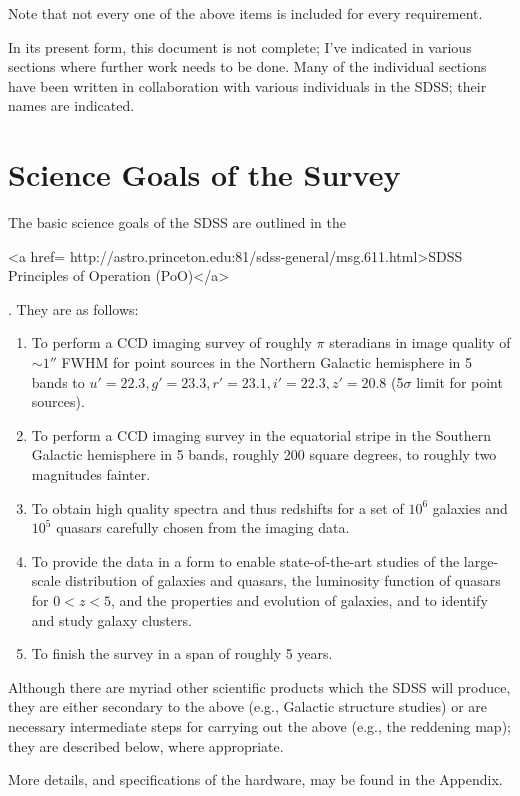 Note that not every one of the above items is included for every
requirement. 

In its present form, this document is not complete; I've indicated in
various sections where further work needs to be done.  Many of the
individual sections have been written in collaboration with various
individuals in the SDSS; their names are indicated. 



\section{Science Goals of the Survey}
\label{sec:parameters}
  The basic science goals of the SDSS are outlined in the
\begin{rawhtml}
<a href=
http://astro.princeton.edu:81/sdss-general/msg.611.html>SDSS Principles of Operation (PoO)</a>\end{rawhtml}.  They are as
follows:
\begin{enumerate}
\item  To perform a CCD imaging survey of roughly $\pi$ steradians in
image quality of $\sim 1''$ FWHM for point sources in the
Northern Galactic hemisphere in 5 bands to $u'=22.3, g'= 23.3, r'=23.1,
i'=22.3, z'=20.8$ (5$\sigma$ limit for point sources).  
\item  To perform a CCD imaging survey in the equatorial stripe in the
Southern Galactic hemisphere in 5 bands, roughly 200 square degrees,
to roughly two magnitudes fainter.
\item  To obtain high quality spectra and thus redshifts for a
set of $10^6$ galaxies
and $10^5$ quasars carefully chosen from the imaging data. 
\item  To provide the data in a form to enable state-of-the-art studies of the
large-scale distribution of galaxies and quasars, the
luminosity function of quasars for $0 < z < 5$, and the properties and evolution of
galaxies, and to identify and study galaxy clusters.
\item To finish the survey in a span of roughly 5 years. 
\end{enumerate}

  Although there are myriad other scientific products which the SDSS
will produce, they are either secondary to the above (e.g., Galactic
structure studies) or are necessary intermediate steps for carrying
out the above (e.g., the reddening map); they are described
below, where appropriate. 

More details, and specifications of the hardware, may be found in the
Appendix. 



